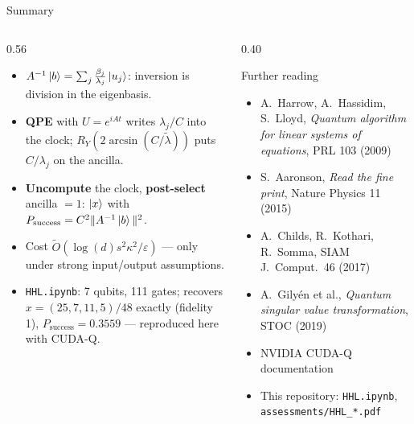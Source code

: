 \documentclass[aspectratio=169,11pt]{beamer}
\newcommand{\key}[1]{{\color{qdark}\textbf{#1}}}
\newcommand{\lt}{\tilde\lambda}
\begin{document}
\begin{frame}{Summary}
  \begin{columns}[T]
    \begin{column}{0.56\textwidth}
      \footnotesize
      \begin{itemize}\itemsep1pt
        \item $A^{-1}\ket b = \sum_j\frac{\beta_j}{\lambda_j}\ket{u_j}$: inversion is division in the eigenbasis.
        \item \key{QPE} with $U = e^{iAt}$ writes $\lambda_j/C$ into the clock; \key{$R_Y(2\arcsin(C/\lt))$} puts $C/\lambda_j$ on the ancilla.
        \item \key{Uncompute} the clock, \key{post-select} ancilla $= 1$: $\ket x$ with $P_{\text{success}} = C^2\|A^{-1}\ket b\|^2$.
        \item Cost $\tilde O(\log(d)s^2\kappa^2/\varepsilon)$ --- only under strong input/output assumptions.
        \item \texttt{HHL.ipynb}: 7 qubits, 111 gates; recovers $x = (25, 7, 11, 5)/48$ exactly (fidelity 1), $P_{\text{success}} = 0.3559$ ---
          reproduced here with CUDA-Q.
      \end{itemize}
    \end{column}
    \begin{column}{0.40\textwidth}
      \begin{block}{Further reading}
        \scriptsize
        \begin{itemize}\itemsep0pt
          \item A.\ Harrow, A.\ Hassidim, S.\ Lloyd, \emph{Quantum algorithm for linear systems of equations}, PRL 103 (2009)
          \item S.\ Aaronson, \emph{Read the fine print}, Nature Physics 11 (2015)
          \item A.\ Childs, R.\ Kothari, R.\ Somma, SIAM J.\ Comput.\ 46 (2017)
          \item A.\ Gilyén et al., \emph{Quantum singular value transformation}, STOC (2019)
          \item NVIDIA CUDA-Q documentation
          \item This repository: \texttt{HHL.ipynb}, \texttt{assessments/HHL\_*.pdf}
        \end{itemize}
      \end{block}
    \end{column}
  \end{columns}
\end{frame}
\end{document}
